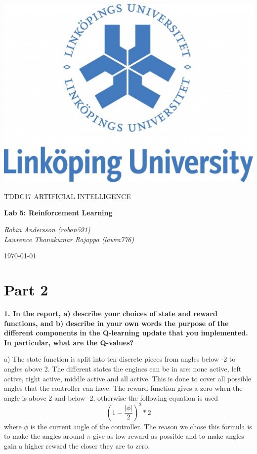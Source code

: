 \documentclass[a4paper,10pt]{article}
\begin{document}
\begin{titlepage}
	\centering
	\includegraphics[width=.6\textwidth]{liu-logo.png}\par
	\vfill
	{\scshape\Large TDDC17 ARTIFICIAL INTELLIGENCE\par}
	{\huge\bfseries Lab 5: Reinforcement Learning\par}
	\vspace{1cm}
	{\large\itshape Robin Andersson (roban591) \\ Lawrence Thanakumar Rajappa (lawra776)\par}
	\vfill
	{\large \today\par}
\end{titlepage}

\section*{Part 2}

\textbf{1. In the report, 
a) describe your choices of state and reward functions, and
b) describe in your own words the purpose of the different components in the Q-learning 
update that you implemented. In particular, what are the Q-values?}

a)
The state function is split into ten discrete pieces from angles below -2 to angles above 2.
The different states the engines can be in are: none active, left active, right active, middle active and all active.
This is done to cover all possible angles that the controller can have.
The reward function gives a zero when the angle is above 2 and below -2,
otherwise the following equation is used
\begin{equation*}
    (1 - \frac{|\phi|}{2})^2 * 2
\end{equation*} 
where $\phi$ is the current angle of the controller.
The reason we chose this formula is to make the angles around $\pi$ give as low reward as possible
and to make angles gain a higher reward the closer they are to zero.
\end{document}
